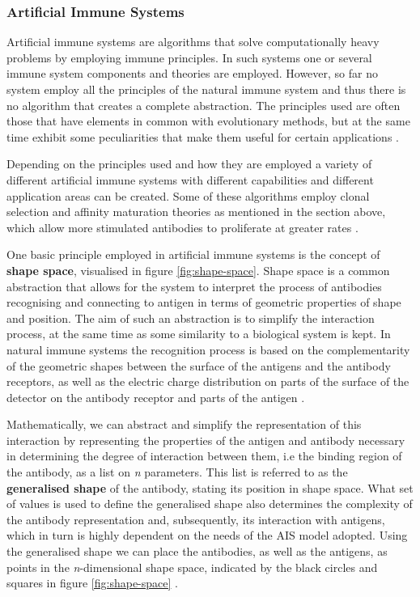 \subsubsection{Artificial Immune Systems}

Artificial immune systems are algorithms that solve computationally heavy problems by employing immune principles. In such systems one or several immune system components and theories are employed. However, so far no system employ all the principles of the natural immune system and thus there is no algorithm that creates a complete abstraction. The principles used are often those that have elements in common with evolutionary methods, but at the same time exhibit some peculiarities that make them useful for certain applications \cite{floreano2008bio}.

Depending on the principles used and how they are employed a variety of different artificial immune systems with different capabilities and different application areas can be created. Some of these algorithms employ clonal selection and affinity maturation theories as mentioned in the section above, which allow more stimulated antibodies to proliferate at greater rates \cite{floreano2008bio}.  

One basic principle employed in artificial immune systems is the concept of \textbf{shape space}, visualised in figure \ref{fig:shape-space}. Shape space is a common abstraction that allows for the system to interpret the process of antibodies recognising and connecting to antigen in terms of geometric properties of shape and position. The aim of such an abstraction is to simplify the interaction process, at the same time as some similarity to a biological system is kept. In natural immune systems the recognition process is based on the complementarity of the geometric shapes between the surface of the antigens and the antibody receptors, as well as the electric charge distribution on parts of the surface of the detector on the antibody receptor and parts of the antigen \cite{floreano2008bio}.

Mathematically, we can abstract and simplify the representation of this interaction by representing the properties of the antigen and antibody necessary in determining the degree of interaction between them, i.e the binding region of the antibody, as a list on \textit{n} parameters. This list is referred to as the \textbf{generalised shape} of the antibody, stating its position in shape space. What set of values is used to define the generalised shape also determines the complexity of the antibody representation and, subsequently, its interaction with antigens, which in turn is highly dependent on the needs of the AIS model adopted. Using the generalised shape we can place the antibodies, as well as the antigens, as points in the \textit{n}-dimensional shape space, indicated by the black circles and squares in figure \ref{fig:shape-space} \cite{floreano2008bio}. 

